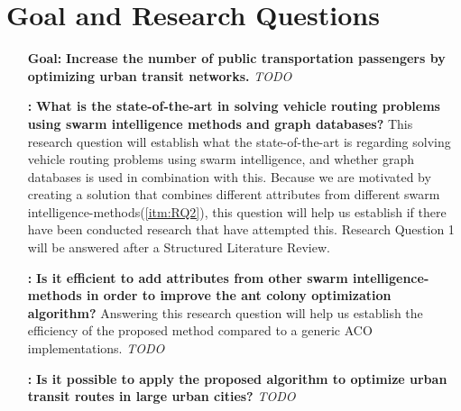 \section{Goal and Research Questions}

\begin{itemize}
\item[\textbf{Goal:}] \label{itm:goal} \textbf{Increase the number of public transportation passengers by optimizing urban transit networks.}
\newline
\emph{\color{blue} TODO}
\end{itemize}

\begin{itemize}

    \item[\textbf{\namedlabel{itm:RQ1}{RQ 1}:}] \textbf{What is the state-of-the-art in solving vehicle routing problems using swarm intelligence methods and graph databases?}
    \newline
    This research question will establish what the state-of-the-art is regarding solving vehicle routing problems using swarm intelligence, and whether graph databases is used in combination with this. Because we are motivated by creating a solution that combines different attributes from different swarm intelligence-methods(\ref{itm:RQ2}), this question will help us establish if there have been conducted research that have attempted this. 
    Research Question 1 will be answered after a Structured Literature Review\citep{kofod2014}. %

    \item[\textbf{\namedlabel{itm:RQ2}{RQ 2}:}]\label{itm:RQ2} \textbf{Is it efficient to add attributes from other swarm intelligence-methods in order to improve the ant colony optimization algorithm?}
    \newline
    Answering this research question will help us establish the efficiency of the proposed method compared to a generic ACO implementations.
    \emph{\color{blue} TODO}

    \item[\textbf{\namedlabel{itm:RQ3}{RQ 3}:}]\label{itm:RQ3}\textbf{Is it possible to apply the proposed algorithm to optimize urban transit routes in large urban cities?}
    \newline
    \emph{\color{blue} TODO}
\end{itemize}




